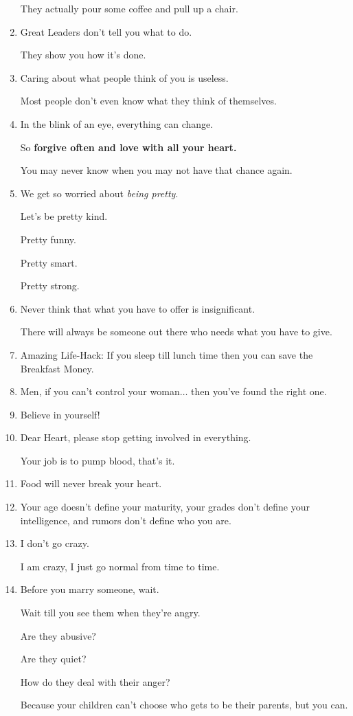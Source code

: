 \documentclass{article}
\begin{document}
\begin{enumerate}
	They actually pour some coffee and pull up a chair.
	\item Great Leaders don't tell you what to do.
	
	They show you how it's done.
	\item Caring about what people think of you is useless.
	
	Most people don't even know what they think of themselves.
	\item In the blink of an eye, everything can change.
	
	So \textbf{forgive often and love with all your heart.}
	
	You may never know when you may not have that chance again.
	\item We get so worried about \textit{being pretty}.
	
	Let's be pretty kind.
	
	Pretty funny.
	
	Pretty smart.
	
	Pretty strong.
	\item Never think that what you have to offer is insignificant.
	
	There will always be someone out there who needs what you have to give.
	\item Amazing Life-Hack: If you sleep till lunch time then you can save the Breakfast Money.
	\item Men, if you can't control your woman$\ldots$ then you've found the right one.
	\item Believe in yourself!
	\item Dear Heart, please stop getting involved in everything.
	
	Your job is to pump blood, that's it.
	\item Food will never break your heart.
	\item Your age doesn't define your maturity, your grades don't define your intelligence, and rumors don't define who you are.
	\item I don't go crazy.
	
	I am crazy, I just go normal from time to time.
	\item Before you marry someone, wait.
	
	Wait till you see them when they're angry.
	
	Are they abusive?
	
	Are they quiet?
	
	How do they deal with their anger?
	
	Because your children can't choose who gets to be their parents, but you can.
	

\end{enumerate}
\end{document}
